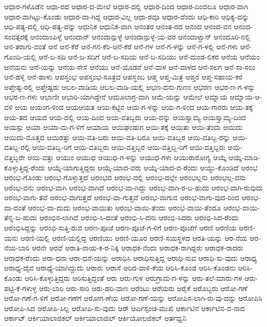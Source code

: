 ಆಧಾರ-ಗಳೊಡೆನ
ಆಧಾ-ರದ
ಆಧಾರ-ದ-ಮೇಲೆ
ಆಧಾರ-ದಲ್ಲಿ
ಆಧಾರ-ದಿಂದ
ಆಧಾರ-ದಿಂದಲೂ
ಆಧಾರ-ವಾಗಿ
ಆಧಾರ-ವಾಗಿಟ್ಟು-ಕೊಂಡು
ಆಧಾರ-ವಾ-ಗಿದ್ದ
ಆಧಾರ-ವಿಲ್ಲ
ಆಧಾ-ರವೂ
ಆಧಾರ-ವೆಂದು
ಆಧಿ-ಕಾರಿ
ಆಧಿಕ್ಯ-ವನ್ನು
ಆಧಿ-ಪತ್ಯ-ದಲ್ಲಿ
ಆಧಿ-ಪತ್ಯ-ವನ್ನು
ಆಧುನಿಕ
ಆಧುನಿಕ-ವಾಗಿ
ಆನಂತರ
ಆನಂತ-ರದ
ಆನಂದ
ಆನಂದ-ವನ
ಆನಂದ-ಸಂವತ್ಸರಕ್ಕೆ
ಆನಂದಾಂಪಿಳ್ಳೆ
ಆನಂದಾನ್
ಆನಂದಾನ್ಪುಳ್ಳೆ
ಆನಂದಾನ್ಪುಳ್ಳೆ-ಯ-ವರ
ಆನಂದಾಳ್ವಾನ್
ಆನಂದೂರಿ-ನಲ್ಲಿ
ಆನ-ತರಾಗು-ವಂತೆ
ಆನೆ
ಆನೆ-ಕೆರೆ
ಆನೆ-ಗನ-ಕೆರಿ-ಆನೆ-ಕೆರೆ
ಆನೆ-ಗಳ
ಆನೆ-ಗ-ಳನ್ನು
ಆನೆ-ಗ-ಳಲ್ಲಿ
ಆನೆ-ಗಳು
ಆನೆ-ಗೊಂದಿ-ಯಲ್ಲಿ
ಆನೆ-ಬ-ಸದಿ
ಆನೆ-ಬ-ಸದಿಗೆ
ಆನೆ-ಬ-ಸದಿಯ
ಆನೆ-ಬ-ಸದಿಯು
ಆನೆ-ಮಂಡ-ಲಿಕರ
ಆನೆಯ
ಆನೆಯಂ
ಆನೆಯನು
ಆನೆ-ಯನ್ನು
ಆನೆಯ-ಸೇಸೆ
ಆನೆಯು
ಆನೆ-ಯೊಡನೆ
ಆನೆ-ವಾಳ
ಆನೆ-ವಾಳದ
ಆನೆ-ಸಲಗ
ಆನೆ-ಸಾ-ಸಲು
ಆನೆ-ಹಳ್ಳಿ
ಆನೆ-ಹಾಳು
ಆಪಸ್ತಂಭ
ಆಪಸ್ತಂಭ-ಸೂತ್ರದ
ಆಪಸ್ಥಂಬ
ಆಪ್ತ
ಆಪ್ತ-ಮಿತ್ರ
ಆಪ್ತರ
ಆಪ್ತ-ಸಹಾಯ-ಕರ
ಆಪ್ತೇಷ್ಟ-ರಲ್ಲಿ
ಆಪ್ತೇಷ್ಟರು
ಆಬಲ-ವಾಡಿಯ
ಆಬಲ-ವಾಡಿ-ಯಲ್ಲಿ
ಆಭಣ-ದನು-ಗುಣಂ
ಆಭರಣ
ಆಭರ-ಣ-ಗ-ಳನ್ನು
ಆಭರ-ಣ-ಗಳು
ಆಭಾಣೀ
ಆಭಾರಿ-ಯಾಗಿದ್ದೇನೆ
ಆಮೂಲಾಗ್ರ-ವಾಗಿ
ಆಮೆ-ಯನ್ನು
ಆಮೇಲೆ
ಆಮ್ನಾಯ
ಆಮ್ನಾಯ-ಆ-ವಳಿ
ಆಯ
ಆಯಂಗ-ಳಿಂದ
ಆಯಆಯತ
ಆಯ-ಕಟ್ಟಿನ
ಆಯ-ಗ-ಳನ್ನು
ಆಯ-ಗ-ಳಿಂದ
ಆಯ-ಗಾರರು
ಆಯ-ತಕ್ಕೆ
ಆಯ-ತದ
ಆಯದ
ಆಯ-ದಲ್ಲಿ
ಆಯ-ದಿಂದ
ಆಯ-ವತಿಬ್ಬರು
ಆಯ-ವನ್ನು
ಆಯಸ್ವಾಮ್ಯ
ಆಯಸ್ವಾಮ್ಯ-ದಿಂದ
ಆಯಸ್ಸು
ಆಯಾ
ಆಯಾ-ಮ-ಗ-ಳಿಗೆ
ಆಯಾಯ
ಆಯಿಘಂಡುಗ
ಆಯಿ-ತಕ್ಕೆ
ಆಯಿತು
ಆಯಿ-ತೆಂದು
ಆಯಿದು
ಆಯಿದು-ಮೊತ್ತದ
ಆಯಿರತ್ತು
ಆಯಿ-ವತಿ-ಬರು
ಆಯಿ-ವತಿ-ಬರೂ
ಆಯಿ-ವತಿಬ್ಬರ
ಆಯಿ-ವತಿಬ್ಬ-ರನ್ನು
ಆಯಿ-ವತಿಬ್ಬ-ರಲ್ಲಿ
ಆಯಿ-ವತಿಬ್ಬ-ರಿಗೆ
ಆಯಿ-ವತಿಬ್ಬರು
ಆಯಿ-ವತ್ತಿಬ್ಬರ
ಆಯಿ-ವತ್ತಿಬ್ಬ-ರಿಗೆ
ಆಯಿ-ವತ್ತಿಬ್ಬರು
ಆಯಿ-ವತ್ತಿಬ್ಬರೇ
ಆಯಿ-ವತ್ತು
ಆಯುಂ
ಆಯುಧ
ಆಯುಧ-ಗ-ಳನ್ನು
ಆಯುಧ-ಗಳು
ಆಯುರಾರೋಗ್ಯ
ಆಯ್ಕೆ
ಆಯ್ಕೆ-ಮಾಡಿ-ಕೊಳ್ಳುತ್ತಿದ್ದ-ರೆಂದು
ಆಯ್ಕೆ-ಯಾಗುತ್ತಿದ್ದರು
ಆಯ್ಕೆ-ಯಾದ-ವರು
ಆಯ್ಕೆ-ಯಾದ-ವ-ರೆಂದು
ಆಯ್ದು-ಕೊಂಡಿದೆ
ಆರಂಭ
ಆರಂಭ-ಗೊಂಡು
ಆರಂಭ-ಗೊಳ್ಳುತ್ತದೆ
ಆರಂಭದ
ಆರಂಭ-ದಲ್ಲಿ
ಆರಂಭ-ದಲ್ಲೇ
ಆರಂಭಲ್ಲನು
ಆರಂಭಲ್ಲ-ವನು
ಆರಂಭ-ವನು
ಆರಂಭ-ವಾಗಿ
ಆರಂಭ-ವಾಗಿದೆ
ಆರಂಭ-ವಾ-ಗಿದ್ದು
ಆರಂಭ-ವಾಗಿ-ರ-ಬ-ಹುದು
ಆರಂಭ-ವಾಗಿ-ರುವುದು
ಆರಂಭ-ವಾಗು-ತವೆ
ಆರಂಭ-ವಾಗುತ್ತದೆ
ಆರಂಭ-ವಾ-ಗುತ್ತವೆ
ಆರಂಭ-ವಾಗುವ
ಆರಂಭ-ವಾಗು-ವುದ-ರಿಂದ
ಆರಂಭ-ವಾ-ದಂತೆ
ಆರಂಭ-ವಾ-ದುದು
ಆರಂಭ-ವಾಯಿತು
ಆರಂಭ-ವಾಯಿ-ತೆಂದು
ಆರಂಭ-ವಾಯಿ-ತೆಂದೂ
ಆರಂಭ-ವಾಯಿ-ತೆನ್ನ-ಬ-ಹುದು
ಆರಂಭಿಸ-ಲಾಗಿದೆ
ಆರಂಭಿ-ಸಿ-ದಂತೆ
ಆರಂಭಿ-ಸಿ-ದನು
ಆರಂಭಿ-ಸಿದರು
ಆರಂಭಿ-ಸಿದ-ರೆಂದು
ಆರಂಭಿಸಿದ್ದನ್ನು
ಆರಂಭಿ-ಸುತ್ತಿ-ರುವ
ಆರಣ-ಪೂಜೆ
ಆರಣ-ಪೂಜೆ-ಗ-ಳಿಗೆ
ಆರಣ-ಪೂಜೆಗೆ
ಆರಣಿ
ಆರಣಿಯ
ಆರಣಿ-ಯನು
ಆರಣಿ-ಯಲ್ಲಿ
ಆರಣಿ-ಯಲ್ಲಿದ್ದ
ಆರಣಿಯು
ಆರಣಿ-ಯೂರ
ಆರಣಿ-ಸಯಸ್ಥಳದ
ಆರತಿ-ಯನ್ನು
ಆರ-ನೆಯ
ಆರ-ನೆಯ-ಬಾರಿ
ಆರನೇ
ಆರವೆ
ಆರಾತಿ-ನಾಯ-ಕ-ರ-ನಿಕ್ಕಿ
ಆರಾಧಕ-ನೆಂದು
ಆರಾಧಕ-ರಾಗಿದ್ದರು
ಆರಾಧಕ-ರಾದರು
ಆರಾಧಕ-ರೆಂದು
ಆರಾ-ಧನಾ
ಆರಾ-ಧನೆ-ಯನ್ನು
ಆರಾಧಿಸಿ
ಆರಾಧಿಸುತ್ತಿದ್ದ
ಆರಾಧಿ-ಸುವ
ಆರಾಧಿ-ಸು-ವುದು
ಆರಾಧ್ಯ
ಆರಾಧ್ಯ-ದೈವ
ಆರಾಧ್ಯೆ-ಯಾಗಿದ್ದುದು
ಆರಾರು
ಆರಾಸೆ
ಆರಿದ-ವಾಳಿ-ಕೆಯ
ಆರಿಸಿ-ಕೊಂಡ
ಆರಿಸಿ-ಕೊಂಡನು
ಆರಿಸಿ-ಕೊಂಡು
ಆರಿಸಿ-ಕೊಳ್ಳುತ್ತಿದ್ದರು
ಆರಿಸುತ್ತಿದ್ದಂತೆ
ಆರು
ಆರು-ಗುಳ
ಆರುಗ್ರಾಮ-ಗ-ಳನ್ನು
ಆರು-ತಲೆ-ಮಾರು-ಗಳ
ಆರು-ಪಟ್ಟಿ-ಕೆ-ಗಳುಳ್ಳ
ಆರು-ಬಾರಿ
ಆರು-ಸಾರಿ
ಆರು-ಹರಿ-ವಾಣ
ಆರೆಂಟು
ಆರೆಯರು
ಆರೈಕೆ
ಆರೊಬ್ಬರು
ಆರೋ-ಗಣೆ
ಆರೋ-ಗಣೆ-ಗ-ಳಿಗೆ
ಆರೋ-ಗಣೆಗೆ
ಆರೋಗ-ಣೆಯ
ಆರೋ-ಗಣೆ-ಯನ್ನು
ಆರೋಪಿಸ-ಲಾಗಿ-ರು-ವು-ದನ್ನು
ಆರೋಪಿಸಿ
ಆರೋಪಿ-ಸಿದ
ಆರೋಪಿ-ಸಿಲ್ಲ
ಆರೋಪಿ-ಸು-ವುದು
ಆರ್
ಆರ್ಎಸ್ಪಂಚ-ಮುಖಿ
ಆರ್ಕಾಟಿನ
ಆರ್ಕಾಟಿನ-ವ-ನಾದ
ಆರ್ಕಾಟ್
ಆರ್ಕಿಯಾಲಾಜಿಕಲ್
ಆರ್ಕಿಯಾಲಾಜಿಲ್
ಆರ್ಕಿಯೋಲಜಿಕಲ್
ಆರ್ತಧ್ವನಿ
